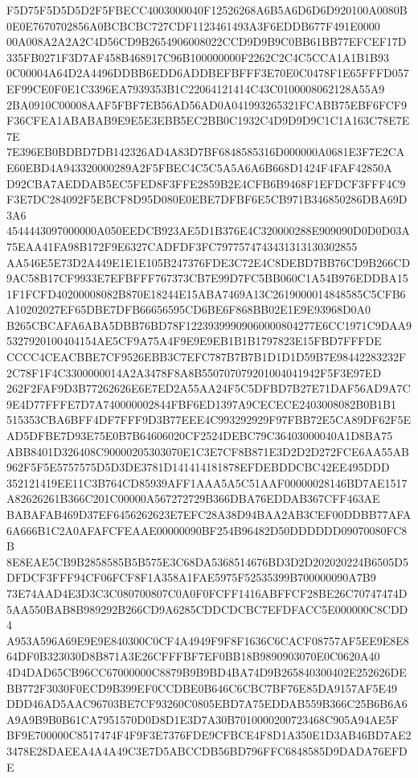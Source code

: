 \documentclass[UTF8,fontset=fandol,zihao=-4,a4paper]{ctexart}
\begin{document}
{{F5D75F5D5D5D2F5FBECC4003000040F12526268A6B5A6D6D6D920100A0080B0E0E7670702856A0BCBCBC727CDF1123461493A3F6EDDB677F491E0000
00A008A2A2A2C4D56CD9B2654906008022CCD9D9B9C0BB61BB77EFCEF17D335FB0271F3D7AF458B468917C96B100000000F2262C2C4C5CCA1A1B1B93
0C00004A64D2A4496DDBB6EDD6ADDBEFBFFF3E70E0C0478F1E65FFFD057EF99CE0F0E1C3396EA7939353B1C22064121414C43C0100008062128A55A9
2BA0910C00008AAF5FBF7EB56AD56AD0A041993265321FCABB75EBF6FCF9F36CFEA1ABABAB9E9E5E3EBB5EC2BB0C1932C4D9D9D9C1C1A163C78E7E7E
7E396EB0BDBD7DB142326AD4A83D7BF6848585316D000000A0681E3F7E2CAE60EBD4A943320000289A2F5FBEC4C5C5A5A6A6B668D1424F4FAF42850A
D92CBA7AEDDAB5EC5FED8F3FFE2859B2E4CFB6B9468F1EFDCF3FFF4C9F3E7DC284092F5EBCF8D95D080E0EBE7DFBF6E5CB971B346850286DBA69D3A6
4544443097000000A050EEDCB923AE5D1B376E4C320000288E909090D0D0D03A75EAA41FA98B172F9E6327CADFDF3FC7977574743431313130302855
AA546E5E73D2A449E1E1E105B247376FDE3C72E4C8DEBD7BB76CD9B266CD9AC58B17CF9933E7EFBFFF767373CB7E99D7FC5BB060C1A54B976EDDBA15
1F1FCFD40200008082B870E18244E15ABA7469A13C2619000014848585C5CFB6A10202027EF65DBE7DFB66656595CD6BE6F868BB02E1E9E93968D0A0
B265CBCAFA6ABA5DBB76BD78F12239399909060000804277E6CC1971C9DAA95327920100404154AE5CF9A75A4F9E9E9EB1B1B1797823E15FBD7FFFDE
CCCC4CEACBBE7CF9526EBB3C7EFC787B7B7B1D1D1D59B7E98442283232F2C78F1F4C3300000014A2A3478F8A8B550707079201004041942F5F3E97ED
262F2FAF9D3B77262626E6E7ED2A55AA24F5C5DFBD7B27E71DAF56AD9A7C9E4D77FFFE7D7A740000002844FBF6ED1397A9CECECE2403008082B0B1B1
515353CBA6BFF4DF7FFF9D3B77EEE4C993292929F97FBB72E5CA89DF62F5EAD5DFBE7D93E75E0B7B64606020CF2524DEBC79C36403000040A1D8BA75
ABB8401D326408C90000205303070E1C3E7CF8B871E3D2D2D272FCE6AA55AB962F5F5E5757575D5D3DE3781D141414181878EFDEBDDCBC42EE495DDD
352121419EE11C3B764CD85939AFF1AAA5A5C51AAF00000028146BD7AE1517A82626261B366C201C00000A567272729B366DBA76EDDAB367CFF463AE
BABAFAB469D37EF6456262623E7EFC28A38D94BAA2AB3CEF00DDBB77AFA6A666B1C2A0AFAFCFEAAE00000090BF254B96482D50DDDDDD09070080FC8B
8E8EAE5CB9B2858585B5B575E3C68DA5368514676BD3D2D202020224B6505D5DFDCF3FFF94CF06FCF8F1A358A1FAE5975F52535399B700000090A7B9
73E74AAD4E3D3C3C080700807C0A0F0FCFF1416ABFFCF28BE26C70747474D5AA550BAB8B989292B266CD9A6285CDDCDCBC7EFDFACC5E000000C8CDD4
A953A596A69E9E9E840300C0CF4A4949F9F8F1636C6CACF08757AF5EE9E8E864DF0B323030D8B871A3E26CFFFBF7EF0BB18B9890903070E0C0620A40
4D4DAD65CB96CC67000000C8879B9B9BD4BA74D9B265840300402E252626DEBB772F3030F0ECD9B399EF0CCDBE0B646C6CBC7BF76E85DA9157AF5E49
DDD46AD5AAC96703BE7CF93260C0805EBD7A75EDDAB559B366C25B6B6A6A9A9B9B0B61CA7951570D0D8D1E3D7A30B7010000200723468C905A94AE5F
BF9E700000C8517474F4F9F3E7376FDE9CFBCE4F8D1A350E1D3AB46BD7AE23478E28DAEEA4A4A49C3E7D5ABCCDB56BD796FFC6848585D9DADA76EFDE
}}
\end{document}
